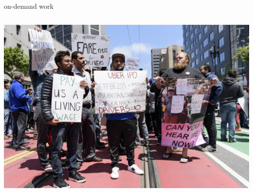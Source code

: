 \documentclass[presentation]{subfiles}
\begin{document}
\begin{frame}{on-demand work}
\begin{columns}[onlytextwidth]
\begin{column}{0.3333333\textwidth}
\includegraphics[width=\textwidth]{figures/gigworkers_protesting.jpg}
\end{column}
\end{columns}


\end{frame}
\end{document}
